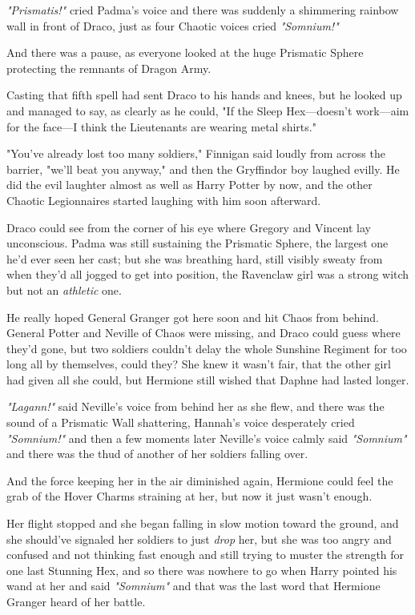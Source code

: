 \emph{"Prismatis!"} cried Padma's voice and there was suddenly a shimmering
rainbow wall in front of Draco, just as four Chaotic voices cried
\emph{"Somnium!"}

And there was a pause, as everyone looked at the huge Prismatic Sphere
protecting the remnants of Dragon Army.

Casting that fifth spell had sent Draco to his hands and knees, but he looked
up and managed to say, as clearly as he could, "If the Sleep Hex---doesn't
work---aim for the face---I think the Lieutenants are wearing metal shirts."

"You've already lost too many soldiers," Finnigan said loudly from across the
barrier, "we'll beat you anyway," and then the Gryffindor boy laughed evilly.
He did the evil laughter almost as well as Harry Potter by now, and the other
Chaotic Legionnaires started laughing with him soon afterward.

Draco could see from the corner of his eye where Gregory and Vincent lay
unconscious. Padma was still sustaining the Prismatic Sphere, the largest one
he'd ever seen her cast; but she was breathing hard, still visibly sweaty from
when they'd all jogged to get into position, the Ravenclaw girl was a strong
witch but not an \emph{athletic} one.

He really hoped General Granger got here soon and hit Chaos from behind.
General Potter and Neville of Chaos were missing, and Draco could guess where
they'd gone, but two soldiers couldn't delay the whole Sunshine Regiment for
too long all by themselves, could they?
\sbreak
She knew it wasn't fair, that the other girl had given all she could, but
Hermione still wished that Daphne had lasted longer.

\emph{"Lagann!"} said Neville's voice from behind her as she flew, and there
was the sound of a Prismatic Wall shattering, Hannah's voice desperately cried
\emph{"Somnium!"} and then a few moments later Neville's voice calmly said
\emph{"Somnium"} and there was the thud of another of her soldiers falling over.

And the force keeping her in the air diminished again, Hermione could feel the
grab of the Hover Charms straining at her, but now it just wasn't enough.

Her flight stopped and she began falling in slow motion toward the ground, and
she should've signaled her soldiers to just \emph{drop} her, but she was too
angry and confused and not thinking fast enough and still trying to muster the
strength for one last Stunning Hex, and so there was nowhere to go when Harry
pointed his wand at her and said \emph{"Somnium"} and that was the last word
that Hermione Granger heard of her battle.
